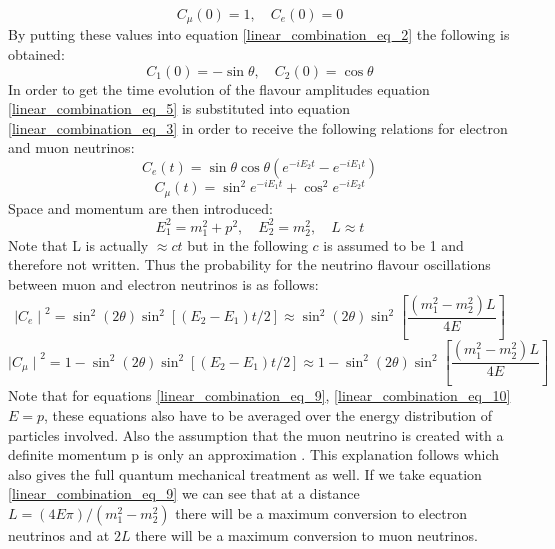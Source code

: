 \documentclass[12pt,a4paper]{article}
\begin{document}
\begin{equation}
    C_\mu(0) = 1, \quad C_e(0) = 0
    \label{linear_combination_eq_4}
\end{equation}
By putting these values into equation \ref{linear_combination_eq_2} the following is obtained:
\begin{equation}
    C_1(0) = -\sin\theta, \quad C_2(0) = \cos\theta
    \label{linear_combination_eq_5}
\end{equation}
In order to get the time evolution of the flavour amplitudes equation \ref{linear_combination_eq_5} is substituted into equation \ref{linear_combination_eq_3} in order to receive the following relations for electron and muon neutrinos: 
\begin{equation}
    C_e(t)=\sin\theta\cos\theta(e^{-iE_2t}-e^{-iE_1t})
    \label{linear_combination_eq_6}
\end{equation}
\begin{equation}
    C_\mu(t)=\sin^{2}e^{-iE_1t} + \cos^{2}e^{-iE_2t}
    \label{linear_combination_eq_7}
\end{equation}
Space and momentum are then introduced: 
\begin{equation}
   E_1^2=m_1^2 + p^2, \quad E_2^2=m_2^2  , \quad L \approx t
    \label{linear_combination_eq_8}
\end{equation}
Note that L is actually $\approx ct$ but in the following $c$ is assumed to be 1 and therefore not written. Thus the probability for the neutrino flavour oscillations between muon and electron neutrinos is as follows: 
\begin{equation}
   {\mid{C_e}\mid}^2 = \sin^2(2\theta)\sin^2[(E_2-E_1)t/2] \approx \sin^2(2\theta)\sin^2\left[\frac{(m_1^2-m_2^2)L}{4E}\right]
    \label{linear_combination_eq_9}
\end{equation}
\begin{equation}
    {\mid{C_\mu}\mid}^2 = 1 - \sin^2(2\theta)\sin^2[(E_2-E_1)t/2] \approx 1 - \sin^2(2\theta)\sin^2\left[\frac{(m_1^2-m_2^2)L}{4E}\right]
    \label{linear_combination_eq_10}
\end{equation}
Note that for equations \ref{linear_combination_eq_9}, \ref{linear_combination_eq_10} $E = p$, these equations also have to be averaged over the energy distribution of particles involved. Also the assumption that the muon neutrino is created with a definite momentum p is only an approximation \cite{sassaroli1999neutrino}. This explanation follows \cite{sassaroli1999neutrino} which also gives the full quantum mechanical treatment as well. If we take equation \ref{linear_combination_eq_9} we can see that at a distance $L = (4E\pi) / (m_1^2 - m_2^2)$ there will be a maximum conversion to electron neutrinos and at $2L$ there will be a maximum conversion to muon neutrinos. 
\end{document}
